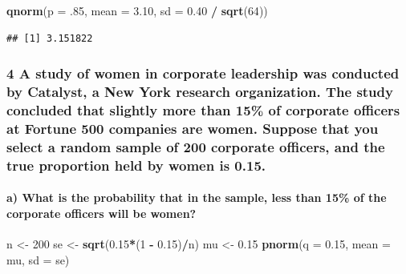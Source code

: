 \documentclass[]{article}
\newenvironment{Shaded}{\begin{snugshade}}{\end{snugshade}}
\newcommand{\KeywordTok}[1]{\textcolor[rgb]{0.13,0.29,0.53}{\textbf{#1}}}
\newcommand{\DataTypeTok}[1]{\textcolor[rgb]{0.13,0.29,0.53}{#1}}
\newcommand{\DecValTok}[1]{\textcolor[rgb]{0.00,0.00,0.81}{#1}}
\newcommand{\FloatTok}[1]{\textcolor[rgb]{0.00,0.00,0.81}{#1}}
\newcommand{\StringTok}[1]{\textcolor[rgb]{0.31,0.60,0.02}{#1}}
\newcommand{\OperatorTok}[1]{\textcolor[rgb]{0.81,0.36,0.00}{\textbf{#1}}}
\newcommand{\NormalTok}[1]{#1}
\let\oldparagraph\paragraph
\renewcommand{\paragraph}[1]{\oldparagraph{#1}\mbox{}}
\begin{document}
\begin{Shaded}
\begin{Highlighting}[]
\KeywordTok{qnorm}\NormalTok{(}\DataTypeTok{p =}\NormalTok{ .}\DecValTok{85}\NormalTok{, }\DataTypeTok{mean =} \FloatTok{3.10}\NormalTok{, }\DataTypeTok{sd =} \FloatTok{0.40} \OperatorTok{/}\StringTok{ }\KeywordTok{sqrt}\NormalTok{(}\DecValTok{64}\NormalTok{))}
\end{Highlighting}
\end{Shaded}

\begin{verbatim}
## [1] 3.151822
\end{verbatim}

\subsubsection{4 A study of women in corporate leadership was conducted
by Catalyst, a New York research organization. The study concluded that
slightly more than 15\% of corporate officers at Fortune 500 companies
are women. Suppose that you select a random sample of 200 corporate
officers, and the true proportion held by women is
0.15.}\label{a-study-of-women-in-corporate-leadership-was-conducted-by-catalyst-a-new-york-research-organization.-the-study-concluded-that-slightly-more-than-15-of-corporate-officers-at-fortune-500-companies-are-women.-suppose-that-you-select-a-random-sample-of-200-corporate-officers-and-the-true-proportion-held-by-women-is-0.15.}

\paragraph{a) What is the probability that in the sample, less than 15\%
of the corporate officers will be
women?}\label{a-what-is-the-probability-that-in-the-sample-less-than-15-of-the-corporate-officers-will-be-women}

\begin{Shaded}
\begin{Highlighting}[]
\NormalTok{n <-}\StringTok{ }\DecValTok{200}
\NormalTok{se <-}\StringTok{ }\KeywordTok{sqrt}\NormalTok{(}\FloatTok{0.15}\OperatorTok{*}\NormalTok{(}\DecValTok{1} \OperatorTok{-}\StringTok{ }\FloatTok{0.15}\NormalTok{)}\OperatorTok{/}\NormalTok{n)}
\NormalTok{mu <-}\StringTok{ }\FloatTok{0.15}
\KeywordTok{pnorm}\NormalTok{(}\DataTypeTok{q =} \FloatTok{0.15}\NormalTok{, }\DataTypeTok{mean =}\NormalTok{ mu, }\DataTypeTok{sd =}\NormalTok{ se)}
\end{Highlighting}
\end{Shaded}
\end{document}
